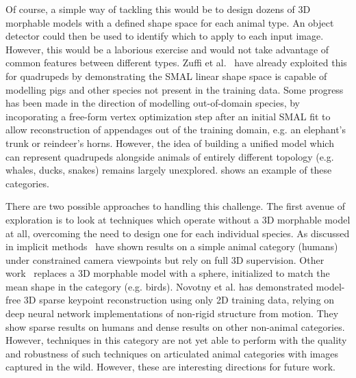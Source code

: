 Of course, a simple way of tackling this would be to design dozens of 3D morphable models with a defined shape space for each animal type. An object detector could then be used to identify which to apply to each input image. However, this would be a laborious exercise and would not take advantage of common features between different types. Zuffi et al.~ have already exploited this for quadrupeds by demonstrating the SMAL linear shape space is capable of modelling pigs and other species not present in the training data. Some progress has been made in the direction of modelling out-of-domain species, by incoporating a free-form vertex optimization step after an initial SMAL fit to allow reconstruction of appendages out of the training domain, e.g. an elephant's trunk or reindeer's horns. However, the idea of building a unified model which can represent quadrupeds alongside animals of entirely different topology (e.g. whales, ducks, snakes) remains largely unexplored.  shows an example of these categories. 





There are two possible approaches to handling this challenge. The first avenue of exploration is to look at techniques which operate without a 3D morphable model at all, overcoming the need to design one for each individual species. As discussed in  implicit methods~ have shown results on a simple animal category (humans) under constrained camera viewpoints but rely on full 3D supervision. Other work~ replaces a 3D morphable model with a sphere, initialized to match the mean shape in the category (e.g. birds). Novotny et al. has demonstrated model-free 3D sparse keypoint reconstruction using only 2D training data, relying on deep neural network implementations of non-rigid structure from motion. They show sparse results on humans and dense results on other non-animal categories. However, techniques in this category are not yet able to perform with the quality and robustness of such techniques on articulated animal categories with images captured in the wild. However, these are interesting directions for future work.


